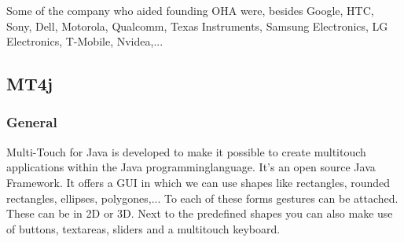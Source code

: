 \documentclass[a4paper,12pt]{report}
\begin{document}
Some of the company who aided founding OHA were, besides Google, HTC, Sony, Dell, Motorola, Qualcomm, Texas Instruments, Samsung Electronics, LG Electronics, T-Mobile,
Nvidea,... 
\subsection{MT4j}
\subsubsection{General}
Multi-Touch for Java is developed to make it possible to create multitouch applications within the Java programminglanguage. It's an open source Java Framework. It offers a GUI in which we can use
shapes like rectangles, rounded rectangles, ellipses, polygones,... To each of these forms gestures can be attached. These can be in 2D or 3D. Next to the predefined shapes you can also make use 
of buttons, textareas, sliders and a multitouch keyboard.
\end{document}
